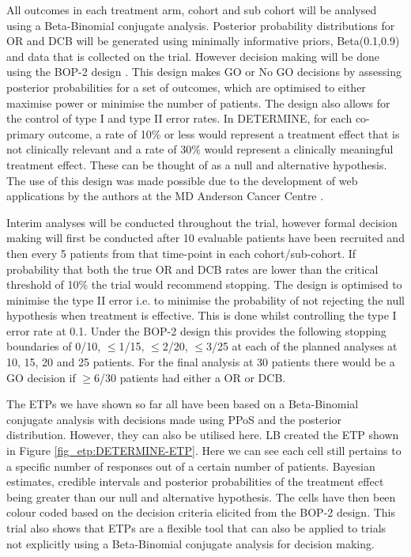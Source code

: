 All outcomes in each treatment arm, cohort and sub cohort will be analysed using a Beta-Binomial conjugate analysis. Posterior probability distributions for OR and DCB will be generated using minimally informative priors, Beta(0.1,0.9) and data that is collected on the trial. However decision making will be done using the BOP-2 design \cite{zhouBOP2BayesianOptimal2017,zhouBayesianOptimalPhase2020}. This design makes GO or No GO decisions by assessing posterior probabilities for a set of outcomes, which are optimised to either maximise power or minimise the number of patients. The design also allows for the control of type I and type II error rates. In DETERMINE, for each co-primary outcome, a rate of 10\% or less would represent a treatment effect that is not clinically relevant and a rate of 30\% would represent a clinically meaningful treatment effect. These can be thought of as a null and alternative hypothesis. The use of this design was made possible due to the development of web applications by the authors at the MD Anderson Cancer Centre \cite{tidwellBayesianClinicalTrials2019}. 

Interim analyses will be conducted throughout the trial, however formal decision making will first be conducted after 10 evaluable patients have been recruited and then every 5 patients from that time-point in each cohort/sub-cohort. If probability that both the true OR and DCB rates are lower than the critical threshold of 10\% the trial would recommend stopping. The design is optimised to minimise the type II error i.e. to minimise the probability of not rejecting the null hypothesis when treatment is effective. This is done whilst controlling the type I error rate at 0.1. Under the BOP-2 design this provides the following stopping boundaries of 0/10, $\leq$1/15, $\leq$2/20, $\leq$3/25 at each of the planned analyses at 10, 15, 20 and 25 patients. For the final analysis at 30 patients there would be a GO decision if $\geq$6/30 patients had either a OR or DCB.   

The ETPs we have shown so far all have been based on a Beta-Binomial conjugate analysis with decisions made using PPoS and the posterior distribution. However, they can also be utilised here. LB created the ETP shown in Figure \ref{fig_etp:DETERMINE-ETP}. Here we can see each cell still pertains to a specific number of responses out of a certain number of patients. Bayesian estimates, credible intervals and posterior probabilities of the treatment effect being greater than our null and alternative hypothesis. The cells have then been colour coded based on the decision criteria elicited from the BOP-2 design. This trial also shows that ETPs are a flexible tool that can also be applied to trials not explicitly using a Beta-Binomial conjugate analysis for decision making. 

